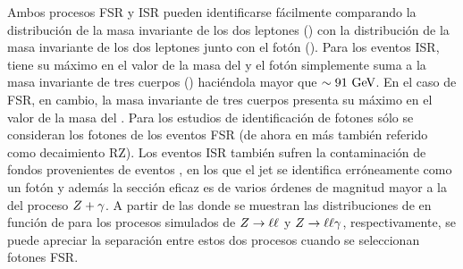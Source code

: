 Ambos procesos \ac{FSR} y \ac{ISR} pueden identificarse fácilmente comparando la distribución de la masa invariante de los dos leptones (\mll) con la distribución de la masa invariante de los dos leptones junto con el fotón (\mlly).
Para los eventos \ac{ISR}, \mll tiene su máximo en el valor de la masa del \Zboson y el fotón simplemente suma a la masa invariante de tres cuerpos (\mlly) haciéndola mayor que \(\sim 91~\text{GeV}\). En el caso de \ac{FSR}, en cambio, la masa invariante de tres cuerpos \mlly presenta su máximo en el valor de la masa del \Zboson.
Para los estudios de identificación de fotones sólo se consideran los fotones de los eventos \ac{FSR} (de ahora en más también referido como decaimiento \acf{RZ}). Los eventos \ac{ISR} también sufren la contaminación de fondos provenientes de eventos \Zjets, en los que el jet se identifica erróneamente como un fotón y además la sección eficaz \Zjets es de varios órdenes de magnitud mayor a la del proceso \(Z+\gamma\). A partir de las \Figs{\ref{fig:pid_ss:event_selection:mll_mlly_distribution:bkg}}{\ref{fig:pid_ss:event_selection:mll_mlly_distribution:signal}} donde se muestran las distribuciones de \mll en función de \mlly para los procesos simulados de \(Z\rightarrow\ell\ell\) y \(Z\rightarrow\ell\ell\gamma\), respectivamente, se puede apreciar la separación entre estos dos procesos cuando se seleccionan fotones \ac{FSR}.

